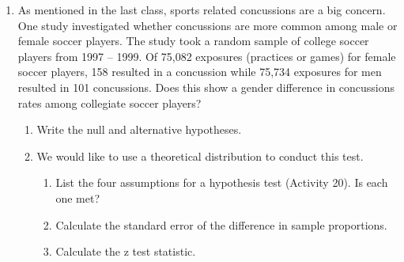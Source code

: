 \begin{enumerate}
\begin{enumerate}
         \end{enumerate}
       \item As mentioned in the last class, sports related
         concussions are a big concern.    One study
         investigated whether concussions are more common among male
         or female soccer players.  The study took a random sample of
         college soccer players from 1997 – 1999.  Of 75,082 exposures
         (practices or games) for female soccer players, 158 resulted
         in a concussion while 75,734 exposures for men resulted in
         101 concussions.  Does this show a gender difference in
         concussions rates among collegiate soccer players?  
         \begin{enumerate}
         \item  Write the null and alternative hypotheses. 
\begin{students}
          \vspace{2cm}
\end{students}
\begin{key}
 {\it  }      
\end{key}

         \item  We would like to use a theoretical distribution to
           conduct this  test. 
          \begin{enumerate}
           \item List the four assumptions for a hypothesis test
             (Activity 20).  Is  each one met?  
\begin{students}
          \vspace{3cm}
\end{students}
\begin{key}
 {\it  }      
\end{key}
           \item  Calculate the standard error of the difference in
             sample proportions. 
\begin{students}
          \vspace{1cm}
\end{students}
\begin{key}
 {\it  }      
\end{key}
           \item  Calculate the z test statistic.
\begin{students}
          \vspace{1.52cm}
\end{students}
\begin{key}
 {\it  }      
\end{key}


\end{enumerate}
\end{enumerate}
\end{enumerate}

